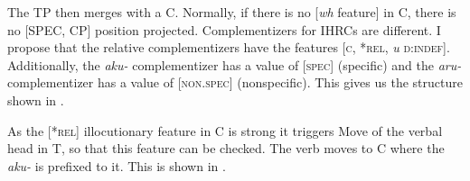 \documentclass[output=paper]{LSP/langsci}
\begin{document}
The TP then merges with a C. Normally, if there is no [\textit{wh} feature] in C, there is no [SPEC, CP] position projected. Complementizers for IHRCs are different.  I propose that the  relative complementizers have the features [\textsc{c, *rel,} \textit{u} \textsc{d:indef}].  Additionally, the \textit{aku-} complementizer has a value of [\textsc{spec}] (specific) and the \textit{aru-} complementizer has a value of [\textsc{non.spec}] (nonspecific). This gives us the structure shown in .

\ea \label{boyle36}
{\hspace{1em}}\newline

\z

As the [*\textsc{rel}] illocutionary feature in C is strong it triggers Move of the verbal head in T, so that this feature can be checked. The verb moves to C where the \textit{aku-} is prefixed to it. This is shown in .

\ea	\label{boyle37}
{\hspace{1em}}\newline

\z
\end{document}
